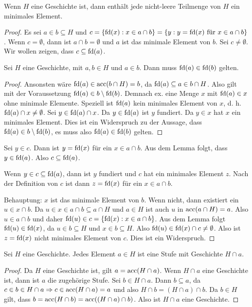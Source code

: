 \begin{satz}
	Wenn $H$ eine Geschichte ist, dann enthält jede nicht-leere Teilmenge von $H$ ein minimales Element.
\end{satz}
\begin{proof}
	Es sei $a\in b \subseteq H$ und $c=\{\operatorname{fd}(x) : x \in a\cap b\}=\{y:y=\operatorname{fd}(x)\text{ für } x\in a \cap b\}$.
	Wenn $c=\emptyset$, dann ist $a\cap b = \emptyset$ und $a$ ist das minimale Element von $b$.
	Sei $c\neq \emptyset$. Wir wollen zeigen, dass $c\subseteq \operatorname{fd}(a)$.
	
	\begin{lemma}
		Sei $H$ eine Geschichte, mit $a,b\in H$ und $a\in b$. Dann muss $\operatorname{fd}(a)\in \operatorname{fd}(b)$ gelten.
	\end{lemma}
	\begin{proof}
		 Ansonsten wäre $\operatorname{fd}(a)\in \operatorname{acc}(b\cap H)=b$, da $\operatorname{fd}(a)\subseteq a \in b \cap H$. Also gilt mit der Voraussetzung $\operatorname{fd}(a)\in b \setminus \operatorname{fd}(b)$. 
		 Demnach ex. eine Menge $x$ mit $\operatorname{fd}(a)\in x$ ohne minimale Elemente. 
		 Speziell ist $\operatorname{fd}(a)$ kein minimales Element von $x$, d. h. $\operatorname{fd}(a)\cap x \neq \emptyset$. Sei $y\in \operatorname{fd}(a)\cap x$. Da $y\in \operatorname{fd}(a)$ ist $y$ fundiert. 
		 Da $y \in x$ hat $x$ ein minimales Element. Dies ist ein Widerspruch zu der Aussage, dass $\operatorname{fd}(a)\in b \setminus \operatorname{fd}(b)$, es muss also $\operatorname{fd}(a)\in \operatorname{fd}(b)$ gelten.
	\end{proof}

	Sei $y\in c$. Dann ist $y = \operatorname{fd}(x)$ für ein $x\in a\cap b$. Aus dem Lemma folgt, dass $y\in \operatorname{fd}(a)$. Also $c\subseteq \operatorname{fd}(a)$.
	
	Wenn $y\in c \subseteq \operatorname{fd}(a)$, dann ist $y$ fundiert und $c$ hat ein minimales Element $z$. Nach der Definition von $c$ ist dann $z=\operatorname{fd}(x)$ für ein $x\in a\cap b$.
	
	Behauptung: $x$ ist das minimale Element von $b$. Wenn nicht, dann existiert ein $u \in x \cap b$. Da $u \in x \in a\cap b\subseteq a\cap H$ und $a\in H$ ist auch $u$ in $\operatorname{acc}(a\cap H)=a$. Also $u \in a\cap b$ und daher $\operatorname{fd}(u)\in c = \{\operatorname{fd}(x):x\in a\cap b\}$. Aus dem Lemma folgt $\operatorname{fd}(u)\in \operatorname{fd}(x)$, da $u\in b \subseteq H$ und $x\in b \subseteq H$. Also $\operatorname{fd}(u)\in \operatorname{fd}(x)\cap c \neq \emptyset$. Also ist $z=\operatorname{fd}(x)$ nicht minimales Element von $c$. Dies ist ein Widerspruch.
\end{proof}

\begin{satz}
	Sei $H$ eine Geschichte. Jedes Element $a\in H$ ist eine Stufe mit Geschichte $H\cap a$.
	\label{ElementVonGeschichteIstStufe}
\end{satz}
\begin{proof}
	Da $H$ eine Geschichte ist, gilt $a=\operatorname{acc}(H\cap a)$. Wenn $H\cap a$ eine Geschichte ist, dann ist $a$ die zugehörige Stufe. Sei $b\in H \cap a$. Dann $b\subseteq a$, da $c\in b \in H\cap a \Rightarrow c \in \operatorname{acc}(H\cap a)=a$ und also $H\cap b = (H\cap a)\cap b$. Da $b\in H$ gilt, dass $b=\operatorname{acc}(H\cap b) = \operatorname{acc}((H\cap a)\cap b)$. Also ist $H\cap a$ eine Geschichte.
\end{proof}


